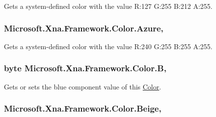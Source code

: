 Gets a system-\/defined color with the value R\+:127 G\+:255 B\+:212 A\+:255.

\hypertarget{struct_microsoft_1_1_xna_1_1_framework_1_1_color_a7cc6e975d9a207b594ebba24ed9a2d34}{}
\subsubsection[{Azure}]{ Microsoft.\+Xna.\+Framework.\+Color.\+Azure\hspace{0.3cm}{\ttfamily [static]}, {\ttfamily [get]}}\label{struct_microsoft_1_1_xna_1_1_framework_1_1_color_a7cc6e975d9a207b594ebba24ed9a2d34}


Gets a system-\/defined color with the value R\+:240 G\+:255 B\+:255 A\+:255.

\hypertarget{struct_microsoft_1_1_xna_1_1_framework_1_1_color_aad34eaa1b49f2e7b91bc660046767b0c}{}
\subsubsection[{B}]{\setlength{\rightskip}{0pt plus 5cm}byte Microsoft.\+Xna.\+Framework.\+Color.\+B\hspace{0.3cm}{\ttfamily [get]}, {\ttfamily [set]}}\label{struct_microsoft_1_1_xna_1_1_framework_1_1_color_aad34eaa1b49f2e7b91bc660046767b0c}


Gets or sets the blue component value of this \hyperlink{struct_microsoft_1_1_xna_1_1_framework_1_1_color}{Color}.

\hypertarget{struct_microsoft_1_1_xna_1_1_framework_1_1_color_ab85dfdc35e501160a91f5db6e9b93e92}{}
\subsubsection[{Beige}]{ Microsoft.\+Xna.\+Framework.\+Color.\+Beige\hspace{0.3cm}{\ttfamily [static]}, {\ttfamily [get]}}\label{struct_microsoft_1_1_xna_1_1_framework_1_1_color_ab85dfdc35e501160a91f5db6e9b93e92}


